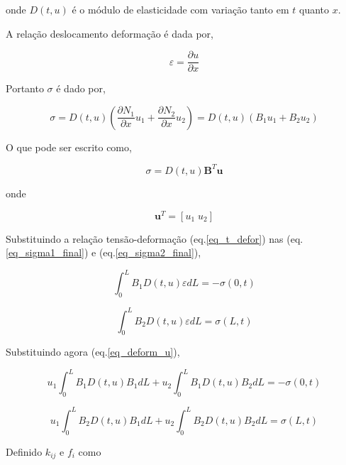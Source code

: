 \documentclass[12pt,a4paper]{article}
\newcommand{\diff}[1]{d#1}
\newcommand{\dd}[2]{\frac{\partial #1}{\partial #2}}
\begin{document}
\noindent
onde $D\left(t,u\right)$ é o módulo de elasticidade com variação tanto em $t$ quanto $x$.

A relação deslocamento deformação é dada por,

\begin{equation}
\varepsilon  = \dd{u}{x}
\end{equation}

Portanto $\sigma$ é dado por,

\begin{equation}
\sigma = D\left(t,u\right) \left(\dd{N_1}{x}u_1 + \dd{N_2}{x}u_2\right) = D\left(t,u\right) \left(B_1 u_1 + B_2 u_2\right)   
\label{eq_deform_u}
\end{equation}

\noindent
O que pode ser escrito como,

\begin{equation}
\sigma = D\left(t,u\right) \mathbf{B}^T \mathbf{u}  
\end{equation}

\noindent
onde

\begin{equation}
\mathbf{u}^T = [u_1\;u_2]  
\end{equation}


Substituindo a relação tensão-deformação (eq.\ref{eq_t_defor}) nas  (eq.\ref{eq_sigma1_final}) e (eq.\ref{eq_sigma2_final}), 

\begin{equation}
\int_0^L B_1 D\left(t,u\right) \varepsilon \diff{L} = - \sigma\left(0,t\right)
\end{equation}

\begin{equation}
\int_0^L B_2 D\left(t,u\right) \varepsilon \diff{L}  = \sigma\left(L,t\right)
\end{equation}

Substituindo agora (eq.\ref{eq_deform_u}),

\begin{equation}
u_1 \int_0^L B_1 D\left(t,u\right) B_1 \diff{L} + u_2 \int_0^L B_1 D\left(t,u\right) B_2 \diff{L} = - \sigma\left(0,t\right)
\end{equation}

\begin{equation}
u_1 \int_0^L B_2 D \left(t,u\right) B_1 \diff{L} + u_2 \int_0^L B_2 D\left(t,u\right) B_2 \diff{L} = \sigma\left(L,t\right)
\end{equation}

Definido $k_{ij}$ e $f_i$ como
\end{document}
